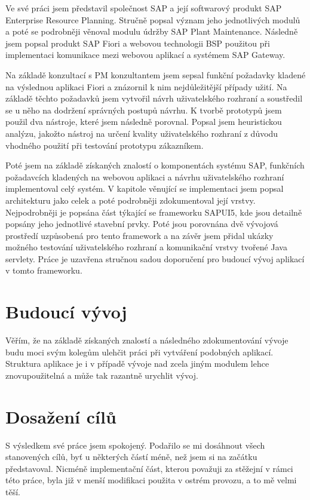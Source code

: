 \documentclass[thesis=M,czech]{FITthesis}[2012/06/26]
\begin{document}
\begin{conclusion}
Ve své práci jsem představil společnost SAP a její softwarový produkt SAP Enterprise Resource Planning. Stručně popsal význam jeho jednotlivých modulů a poté se podrobněji věnoval modulu údržby SAP Plant Maintenance. Následně jsem popsal produkt SAP Fiori a webovou technologii BSP použitou při implementaci komunikace mezi webovou aplikací a systémem SAP Gateway. 

Na základě konzultací s PM konzultantem jsem sepsal funkční požadavky kladené na výslednou aplikaci Fiori a znázornil k nim nejdůležitější případy užití. Na základě těchto požadavků jsem vytvořil návrh uživatelského rozhraní a soustředil se u něho na dodržení správných postupů návrhu. K tvorbě prototypů jsem použil dva nástroje, které jsem následně porovnal. Popsal jsem heuristickou analýzu, jakožto nástroj na určení kvality uživatelského rozhraní z důvodu vhodného použití při testování prototypu zákazníkem. 

Poté jsem na základě získaných znalostí o komponentách systému SAP, funkčních požadavcích kladených na webovou aplikaci a návrhu uživatelského rozhraní implementoval celý systém. V kapitole věnující se implementaci jsem popsal architekturu jako celek a poté podrobněji zdokumentoval její vrstvy. Nejpodrobněji je popsána část týkající se frameworku SAPUI5, kde jsou detailně popsány jeho jednotlivé stavební prvky. Poté jsou porovnána dvě vývojová prostředí uzpůsobená pro tento framework a na závěr jsem přidal ukázky možného testování uživatelského rozhraní a komunikační vrstvy tvořené Java servlety. Práce je uzavřena stručnou sadou doporučení pro budoucí vývoj aplikací v tomto frameworku.

\section{Budoucí vývoj}
Věřím, že na základě získaných znalostí a následného zdokumentování vývoje budu moci svým kolegům ulehčit práci při vytváření podobných aplikací. Struktura aplikace je i v případě vývoje nad zcela jiným modulem lehce znovupoužitelná a může tak razantně urychlit vývoj.  

\section{Dosažení cílů}
S výsledkem své práce jsem spokojený. Podařilo se mi dosáhnout všech stanovených cílů, byť u některých částí méně, než jsem si na začátku představoval. Nicméně implementační část, kterou považuji za stěžejní v rámci této práce, byla již v menší modifikaci použita v ostrém provozu, a to mě velmi těší.

\end{conclusion}
\end{document}
